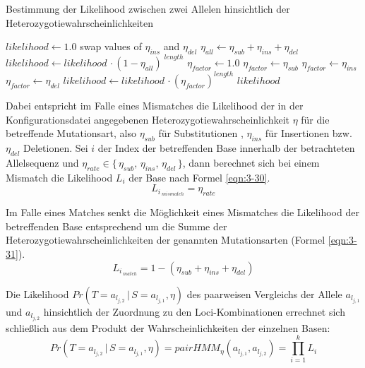 \begin{algorithm}[H]
	\caption{Bestimmung der Likelihood zwischen zwei Allelen hinsichtlich der Heterozygotiewahrscheinlichkeiten}  \label{alg:lh_het}
	\begin{algorithmic}[1]	
		\State $likelihood \gets 1.0$
		\State swap values of $\eta_{ins}$ and $\eta_{del}$
		\EndIf
		\State $\eta_{all} \gets \eta_{sub}+\eta_{ins}+\eta_{del}$
		\State $ likelihood \gets likelihood \, \cdotp (1 - \eta_{all})^{\;length} $
		\EndIf		    
		\State $ \eta_{factor} \gets 1.0$			    	
		\State $\eta_{factor} \gets \eta_{sub}$
		\EndIf	
		\State $\eta_{factor} \gets \eta_{ins}$
		\EndIf
		\State $\eta_{factor} \gets \eta_{del}$
		\EndIf
		\State $ likelihood \gets likelihood \, \cdotp (\eta_{factor})^{length}$
		\EndIf
		\EndFor
		\State \Return $ likelihood $
		\EndFunction
	\end{algorithmic}
\end{algorithm}

Dabei entspricht im Falle eines Mismatches die Likelihood der in der Konfigurationsdatei angegebenen Heterozygotiewahrscheinlichkeit $ \eta $ für die betreffende Mutationsart, also $ \eta_{sub} $ für Substitutionen , $ \eta_{ins} $ für Insertionen bzw. $ \eta_{del} $ Deletionen. Sei $i$ der Index der betreffenden Base innerhalb der betrachteten Allelsequenz und $ \eta_{rate} \in \{\,\eta_{sub},\, \eta_{ins},\, \eta_{del}\,\}$, dann berechnet sich bei einem Mismatch die Likelihood $L_{i}$ der Base nach Formel \eqref{eqn:3-30}.
\begin{equation} \label{eqn:3-30}
\tag{3-30}
L_{i\,_{mismatch}} = \eta_{rate}
\end{equation}

Im Falle eines Matches senkt die Möglichkeit eines Mismatches die Likelihood der betreffenden Base entsprechend um die Summe der Heterozygotiewahrscheinlichkeiten der genannten Mutationsarten (Formel \eqref{eqn:3-31}).
\begin{equation} \label{eqn:3-31}
\tag{3-31}
L_{i\,_{match}} = 1 - (\eta_{sub} + \eta_{ins} + \eta_{del})
\end{equation}

Die Likelihood $ Pr(T=a_{l_{j,2}} \, | \, S=a_{l_{j,1}}, \eta) $ des paarweisen Vergleichs der Allele $a_{l_{j,1}}$ und $a_{l_{j,2}}$ hinsichtlich der Zuordnung zu den Loci-Kombinationen errechnet sich schließlich aus dem Produkt der Wahrscheinlichkeiten der einzelnen Basen:
\begin{equation} \label{eqn:3-32}
\tag{3-32}
Pr(T=a_{l_{j,2}} \, | \, S=a_{l_{j,1}}, \eta) = pairHMM_{\eta}(a_{l_{j,1}}, a_{l_{j,2}}) = \prod_{i=1}^{k}L_{i}
\end{equation}

